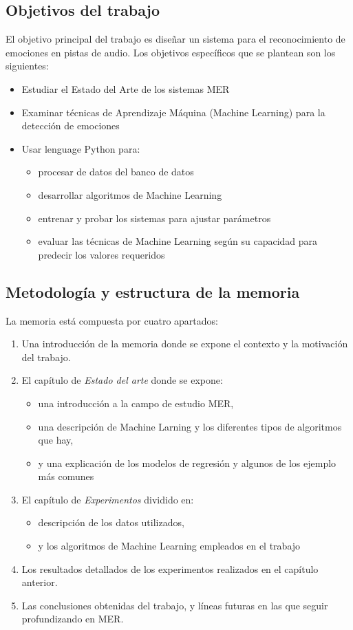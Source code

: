 \documentclass[12pt,a4paper,Spanish]{article}
\begin{document}
\subsection{Objetivos del trabajo}
El objetivo principal del trabajo es diseñar un sistema para el reconocimiento de emociones en pistas de audio.
Los objetivos específicos que se plantean son los siguientes:
\begin{itemize}
\item Estudiar el Estado del Arte de los sistemas MER
\item Examinar técnicas de Aprendizaje Máquina (Machine Learning) para la detección de emociones
\item Usar lenguage Python para:
 	\begin{itemize}
 		\item procesar de datos del banco de datos 
 		\item desarrollar algoritmos de Machine Learning
 		\item entrenar y probar los sistemas para ajustar parámetros
 		\item evaluar las técnicas de Machine Learning según su capacidad para predecir los valores requeridos 		
 	\end{itemize}
\end{itemize}

\subsection{Metodología y estructura de la memoria}
La memoria está compuesta por cuatro apartados:
\begin{enumerate}
	\item Una introducción de la memoria donde se expone el contexto y la motivación del trabajo.
	\item El capítulo de \textit{Estado del arte} donde se expone:
	\begin{itemize}
		\item una introducción a la campo de estudio MER,
		\item una descripción de Machine Larning y los diferentes tipos de algoritmos que hay, 
		\item y una explicación de los modelos de regresión y algunos de los ejemplo más comunes
	\end{itemize}
	\item El capítulo de \textit{Experimentos} dividido en:
	\begin{itemize}
		\item descripción de los datos utilizados,
		\item y los algoritmos de Machine Learning empleados en el trabajo
	\end{itemize}
	\item Los resultados detallados de los experimentos realizados en el capítulo anterior.
	\item Las conclusiones obtenidas del trabajo, y líneas futuras en las que seguir profundizando en MER.
\end{enumerate}
\end{document}

